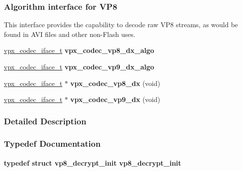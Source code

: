 \subsubsection*{Algorithm interface for V\+P8}
\label{_amgrp0b829b38ff2e659173b35cd78e0735bd}%
This interface provides the capability to decode raw V\+P8 streams, as would be found in A\+V\+I files and other non-\/\+Flash uses. \begin{DoxyCompactItemize}
\item 
\hypertarget{group__vp8__decoder_ga1e151f9094620511e7aa49c04bf8b79e}{\hyperlink{group__codec_gae99c3b04f4a567a311211cce3ae6b83b}{vpx\+\_\+codec\+\_\+iface\+\_\+t} {\bfseries vpx\+\_\+codec\+\_\+vp8\+\_\+dx\+\_\+algo}}\label{group__vp8__decoder_ga1e151f9094620511e7aa49c04bf8b79e}

\item 
\hypertarget{group__vp8__decoder_gabb581a7e48d55dbda975c8bfbc2d615c}{\hyperlink{group__codec_gae99c3b04f4a567a311211cce3ae6b83b}{vpx\+\_\+codec\+\_\+iface\+\_\+t} {\bfseries vpx\+\_\+codec\+\_\+vp9\+\_\+dx\+\_\+algo}}\label{group__vp8__decoder_gabb581a7e48d55dbda975c8bfbc2d615c}

\item 
\hypertarget{group__vp8__decoder_ga105d15fdb6baef8a2f02d6d5283847fb}{\hyperlink{group__codec_gae99c3b04f4a567a311211cce3ae6b83b}{vpx\+\_\+codec\+\_\+iface\+\_\+t} $\ast$ {\bfseries vpx\+\_\+codec\+\_\+vp8\+\_\+dx} (void)}\label{group__vp8__decoder_ga105d15fdb6baef8a2f02d6d5283847fb}

\item 
\hypertarget{group__vp8__decoder_ga62b70b5b21a01ab2d57adb9f67f25d60}{\hyperlink{group__codec_gae99c3b04f4a567a311211cce3ae6b83b}{vpx\+\_\+codec\+\_\+iface\+\_\+t} $\ast$ {\bfseries vpx\+\_\+codec\+\_\+vp9\+\_\+dx} (void)}\label{group__vp8__decoder_ga62b70b5b21a01ab2d57adb9f67f25d60}

\end{DoxyCompactItemize}


\subsubsection{Detailed Description}


\subsubsection{Typedef Documentation}
\hypertarget{group__vp8__decoder_ga718de6c94c9561b35aa7497f1182758b}{
\paragraph[{vp8\+\_\+decrypt\+\_\+init}]{\setlength{\rightskip}{0pt plus 5cm}typedef struct {\bf vp8\+\_\+decrypt\+\_\+init}  {\bf vp8\+\_\+decrypt\+\_\+init}}}\label{group__vp8__decoder_ga718de6c94c9561b35aa7497f1182758b}


